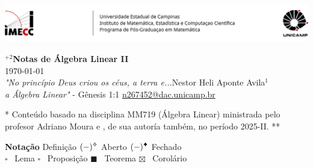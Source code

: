 \documentclass[a4paper, 17pt]{extarticle}
\begin{document}
\setlength{\columnsep}{1in}


\-\vspace{-1.3cm} 

\par\noindent \includegraphics[width = \linewidth]{Imagens/Header.png} 


\begin{center} %
{%
 \LARGE \textbf{\(^{+2}\)Notas de Álgebra Linear II}} \vspace{0.1in}   \\
 { \today }\\ 
 {\small
 \vspace{0.4cm}\emph{"No princípio Deus criou os céus, a terra e...}\hfill Nestor Heli Aponte Avila\(^{1}\) \\ 
\emph{a Álgebra Linear"} - Gênesis 1:1 \hfill \href{mailto:n267452@dac.unicamp.br}{\url{n267452@dac.unicamp.br}}} %
\end{center} %
\- \vspace{-1cm}

{\small ** Conteúdo basado na disciplina MM719 (Álgebra Linear) ministrada pelo profesor Adriano Moura e  \cite{MA719}, de sua autoría também, no período 2025-II. **\vspace{0.3cm}}%


{\large \textbf{Notação}} \hfill {}  Definição \hfill \((-)^{\text{\ding{71}}}\)  Aberto \hfill  \((-)^{\text{\ding{70}}}\) Fechado \\ 
{\scriptsize$\square$} \ Lema \hspace{2.4cm} {\large$\square$} \ Proposição \hspace{1.5cm}  {\large $\blacksquare$}  \ Teorema \hspace{2cm} {\scriptsize $\boxtimes$}  \ Corolário
\end{document}

